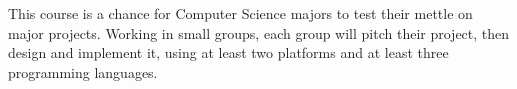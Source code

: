 This course is a chance for Computer Science majors to test their mettle on major projects. Working in small groups, each group will pitch their project, then design and implement it, using at least two platforms and at least three programming languages.